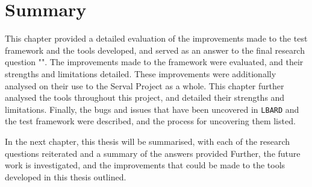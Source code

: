 \section{Summary}
This chapter provided a detailed evaluation of the improvements made to the test framework and the tools developed, and served as an answer to the final research question "\fourthRQ".
The improvements made to the framework were evaluated, and their strengths and limitations detailed.
These improvements were additionally analysed on their use to the Serval Project as a whole.
This chapter further analysed the tools throughout this project, and detailed their strengths and limitations.
Finally, the bugs and issues that have been uncovered in \texttt{LBARD} and the test framework were described, and the process for uncovering them listed.

In the next chapter, this thesis will be summarised, with each of the research questions reiterated and a summary of the answers provided
Further, the future work is investigated, and the improvements that could be made to the tools developed in this thesis outlined.